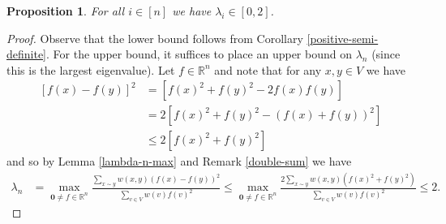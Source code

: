 \documentclass[a4paper,11pt]{article}
\newtheorem{proposition}[theorem]{Proposition}
\theoremstyle{definition}
\newcommand{\R}{\mathbb{R}}
\newcommand{\rayleighfull}[1]{\frac{\sum_{x \sim y} w(x, y)\left(#1(x) - #1(y)\right)^2}{\sum_{v \in V} w(v)#1(v)^2}}
\begin{document}
\begin{proposition}\label{eigenvalue-bound-0-2}
For all $i \in [n]$ we have $\lambda_i \in [0, 2]$.
\end{proposition}
\begin{proof}
Observe that the lower bound follows from Corollary \ref{positive-semi-definite}. For the upper bound, it suffices to place an upper bound on $\lambda_n$ (since this is the largest eigenvalue). Let $f \in \R^n$ and note that for any $x, y \in V$ we have
\begin{align*}
\left[f(x) - f(y)\right]^2 &= \left[f(x)^2 + f(y)^2 - 2f(x)f(y)\right] \\
&= 2\left[f(x)^2 + f(y)^2 - (f(x) + f(y))^2\right] \\
&\le 2\left[f(x)^2 + f(y)^2\right]
\end{align*}
and so by Lemma \ref{lambda-n-max} and Remark \ref{double-sum} we have
\begin{align*}
\lambda_n 
&= \max_{\bm{0} \ne f \in \R^n} \rayleighfull{f} \le \max_{\bm{0} \ne f \in \R^n} \frac{2\sum_{x \sim y} w(x, y)\left(f(x)^2 + f(y)^2\right) }{\sum_{v \in V} w(v)f(v)^2} \le 2.
\end{align*}
\end{proof}
\end{document}

